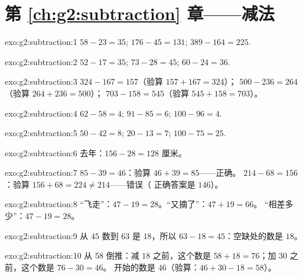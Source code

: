 \section*{第 \ref{ch:g2:subtraction} 章——减法}

\begin{solution}{exo:g2:subtraction:1}
$58 - 23 = 35$; \quad $176 - 45 = 131$; \quad $389 - 164 = 225$.
\end{solution}

\begin{solution}{exo:g2:subtraction:2}
$52 - 17 = 35$; \quad $73 - 28 = 45$; \quad $60 - 24 = 36$.
\end{solution}

\begin{solution}{exo:g2:subtraction:3}
$324 - 167 = 157$（验算 $157 + 167 = 324$）； \quad
$500 - 236 = 264$（验算 $264 + 236 = 500$）； \quad
$703 - 158 = 545$（验算 $545 + 158 = 703$）。
\end{solution}

\begin{solution}{exo:g2:subtraction:4}
$62 - 58 = 4$; \quad $91 - 85 = 6$; \quad $100 - 96 = 4$.
\end{solution}

\begin{solution}{exo:g2:subtraction:5}
$50 - 42 = 8$; \quad $20 - 13 = 7$; \quad $100 - 75 = 25$.
\end{solution}

\begin{solution}{exo:g2:subtraction:6}
去年：$156 - 28 = 128$ 厘米。
\end{solution}

\begin{solution}{exo:g2:subtraction:7}
$85 - 39 = 46$：验算 $46 + 39 = 85$——正确。
$214 - 68 = 156$：验算 $156 + 68 = 224 \neq 214$——错误（
正确答案是 $146$）。
\end{solution}

\begin{solution}{exo:g2:subtraction:8}
“飞走”：$47 - 19 = 28$。“又摘了”：$47 + 19 = 66$。
“相差多少”：$47 - 19 = 28$。
\end{solution}

\begin{solution}{exo:g2:subtraction:9}
从 $45$ 数到 $63$ 是 $18$，所以 $63 - 18 = 45$：空缺处的数是 $18$。
\end{solution}

\begin{solution}{exo:g2:subtraction:10}
从 $58$ 倒推：减 $18$ 之前，这个数是
$58 + 18 = 76$；加 $30$ 之前，这个数是 $76 - 30 = 46$。
开始的数是 $46$（验算：$46 + 30 - 18 = 58$）。
\end{solution}
